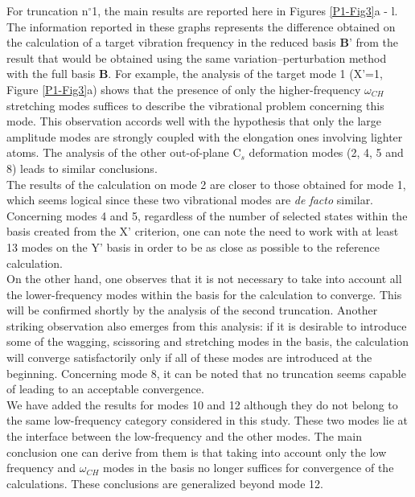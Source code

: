 	For truncation n$^{\circ}$1, the main results are reported here in Figures \ref{P1-Fig3}a - l. The information reported in these graphs represents the difference obtained on the calculation of a target vibration frequency in the reduced basis $\textbf{B’}$ from the result that would be obtained using the same variation–perturbation method with the full basis $\textbf{B}$. For example, the analysis of the target mode 1 (X’=1, Figure \ref{P1-Fig3}a) shows that the presence of only the higher-frequency $\omega_{CH}$ stretching modes suffices to describe the vibrational problem concerning this mode. This observation accords well with the hypothesis that only the large amplitude modes are strongly coupled with the elongation ones involving lighter atoms. The analysis of the other out-of-plane C$_{s}$ deformation modes (2, 4, 5 and 8) leads to similar conclusions.\\
	
	 The results of the calculation on mode 2 are closer to those obtained for mode 1, which seems logical since these two vibrational modes are \textit{de facto} similar. Concerning modes 4 and 5, regardless of the number of selected states within the basis created from the X’ criterion, one can note the need to work with at least 13 modes on the Y’ basis in order to be as close as possible to the reference calculation.\\
	 
	  On the other hand, one observes that it is not necessary to take into account all the lower-frequency modes within the basis for the calculation to converge. This will be confirmed shortly by the analysis of the second truncation. Another striking observation also emerges from this analysis: if it is desirable to introduce some of the wagging, scissoring and stretching modes in the basis, the calculation will converge satisfactorily only if all of these modes are introduced at the beginning. Concerning mode 8, it can be noted that no truncation seems capable of leading to an acceptable convergence.\\
	
	We have added the results for modes 10 and 12 although they do not belong to the same low-frequency category considered in this study. These two modes lie at the interface between the low-frequency and the other modes. The main conclusion one can derive from them is that taking into account only the low frequency and $\omega_{CH}$ modes in the basis no longer suffices for convergence of the calculations. These conclusions are generalized beyond mode 12.\\
	
